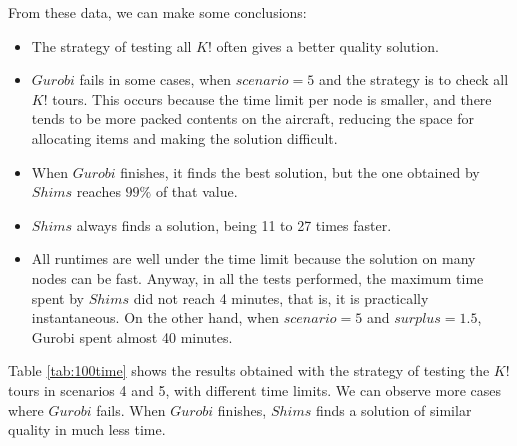 \documentclass[preprint]{elsarticle}
\begin{document}
From these data, we can make some conclusions:
\begin{itemize}
\item The strategy of testing all $K!$\/ often gives a better quality solution.
\item $Gurobi$\/ fails in some cases, when $scenario=5$\/ and the strategy is to check all $K!$\/ tours. This occurs because the time limit per node is smaller, and there tends to be more packed contents on the aircraft, reducing the space for allocating items and making the solution difficult.
\item When $Gurobi$\/ finishes, it finds the best solution, but the one obtained by $Shims$\/ reaches $99\%$\/ of that value.
\item $Shims$\/ always finds a solution, being 11 to 27 times faster.
\item All runtimes are well under the time limit because the solution on many nodes can be fast. Anyway, in all the tests performed, the maximum time spent by $Shims$\/ did not reach 4 minutes, that is, it is practically instantaneous. On the other hand, when $scenario=5$\/ and $surplus=1.5$, Gurobi spent almost 40 minutes.
\end{itemize}

Table \ref{tab:100time} shows the results obtained with the strategy of testing the $K!$\/ tours in scenarios 4 and 5, with different time limits. We can observe more cases where $Gurobi$\/ fails. When $Gurobi$ finishes, $Shims$\/ finds a solution of similar quality in much less time.
\end{document}
